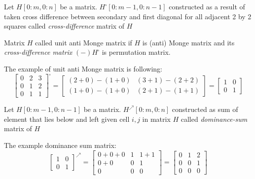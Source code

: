 \begin{definition}
Let $H[0:m,0:n]$  be a matrix.
$H^{\square}[0:m-1,0:n-1]$ constructed as a result of taken cross difference between secondary and first diagonal for all adjacent 2 by 2 squares called \emph{cross-difference} matrix of  $H$
\end{definition}


\begin{definition}
Matrix $H$ called unit anti Monge matrix if $H$ is (anti) Monge matrix and its \emph{cross-difference matrix} $(-)H^{\square}$ is permutation matrix.
\end{definition}
The example of unit anti Monge matrix is following:
\begin{equation}
\begin{bmatrix}
0 & 2 & 3 \\
0 & 1 & 2 \\
0 & 1 & 1
\end{bmatrix} ^ { \square} =
\begin{bmatrix}
(2 + 0) - (1 + 0)  & (3 + 1) - (2 + 2)  \\
(1 + 0) - (1 + 0) &  (2 + 1) - (1 + 1) 
\end{bmatrix} = 
\begin{bmatrix}
1 & 0  \\
0 & 1 
\end{bmatrix} 
\end{equation}
 


\begin{definition}
Let $H[0:m-1,0:n-1]$  be a matrix.
$H^{\nearrow}[0:m,0:n]$ constructed as sum of element that lies below and left given cell $i,j$ in matrix $H$ called \emph{dominance-sum} matrix of $H$
\end{definition}

The example dominance sum matrix:
\begin{equation}
\begin{bmatrix}
1 & 0  \\
0 & 1 
\end{bmatrix}^{\nearrow} =
\begin{bmatrix}
0+0+0 & 1 & 1+1 \\
0+0 & 0 & 1 \\
0 & 0 & 0
\end{bmatrix} =
\begin{bmatrix}
0 & 1 & 2 \\
0 & 0 & 1 \\
0 & 0 & 0
\end{bmatrix}
\end{equation}

